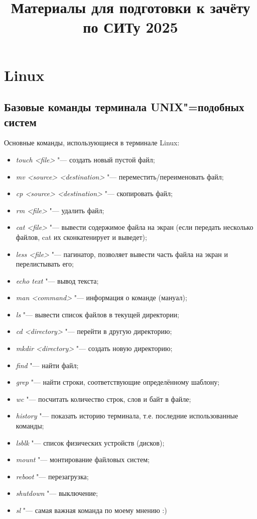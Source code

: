 \documentclass[12pt]{article}
\begin{document}
\author{}
\title{Материалы для подготовки к зачёту по СИТу 2025}
\date{}
\maketitle

\section{Linux}

\subsection{Базовые команды терминала UNIX"=подобных систем}
Основные команды, использующиеся в терминале Linux:
\begin{itemize}
\item \textit{touch <file>} "--- создать новый пустой файл;
\item \textit{mv <source> <destination>} "--- переместить/переименовать файл;
\item \textit{cp <source> <destination>} "--- скопировать файл;
\item \textit{rm <file>} "--- удалить файл;
\item \textit{cat <file>} "--- вывести содержимое файла на экран (если передать несколько файлов, cat их сконкатенирует и выведет);
\item \textit{less <file>} "--- пагинатор, позволяет вывести часть файла на экран и перелистывать его;
\item \textit{echo \glqq text\grqq} "--- вывод текста;
\item \textit{man <command>} "--- информация о команде (мануал);
\item \textit{ls} "--- вывести список файлов в текущей директории;
\item \textit{cd <directory>} "--- перейти в другую директорию;
\item \textit{mkdir <directory>} "--- создать новую директорию;
\item \textit{find} "--- найти файл;
\item \textit{grep} "--- найти строки, соответствующие определённому шаблону;
\item \textit{wc} "--- посчитать количество строк, слов и байт в файле;
\item \textit{history} "--- показать историю терминала, т.е. последние использованные команды;
\item \textit{lsblk} "--- список физических устройств (дисков);
\item \textit{mount} "--- монтирование файловых систем;
\item \textit{reboot} "--- перезагрузка;
\item \textit{shutdown} "--- выключение;
\item \textit{sl} "--- самая важная команда по моему мнению :)
\end{itemize}
\end{document}
